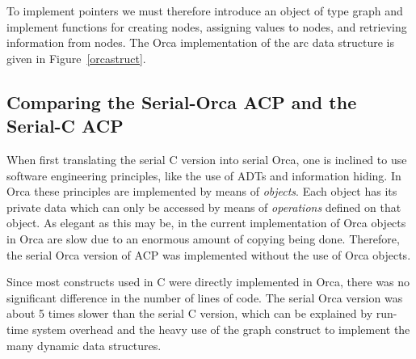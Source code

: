 To implement pointers we must therefore introduce an object of type graph
and implement functions for creating nodes, assigning values to
nodes, and retrieving information from nodes. The Orca implementation
of the arc data structure is given in Figure~\ref{orcastruct}.

\subsection{Comparing the Serial-Orca ACP and the Serial-C ACP}

When first translating the serial C version into serial Orca,
one is inclined to use software engineering principles, like
the use of ADTs and information hiding. In Orca these principles are
implemented by means of {\em objects}. Each object has its private data
which can only be accessed by means of {\em operations} defined on
that object. As elegant as this may be, in the current
implementation of Orca objects in Orca are slow due to an enormous amount of
copying being done. Therefore, the serial Orca version of ACP was implemented
without the use of Orca objects.

Since most constructs used in C were directly implemented in Orca,
there was no significant difference in the number of lines of code.
The serial Orca version was about 5 times slower than the serial C
version, which can be explained by run-time system overhead and the heavy use
of the graph construct to implement the many dynamic data structures.

